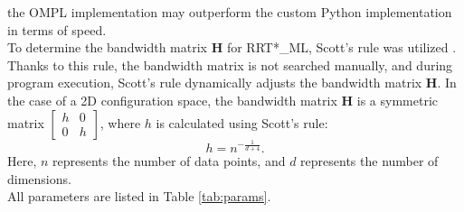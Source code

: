 \documentclass{ctuthesis}
\begin{document}
the OMPL implementation may outperform the custom Python implementation in terms of speed. 
\\[12pt]
To determine the bandwidth matrix $\mathbf{H}$ for RRT*\_ML, 
Scott's rule was utilized \cite{Scott1992MultivariateDE}. 
Thanks to this rule, the bandwidth matrix is not searched manually, 
and during program execution, Scott's rule dynamically adjusts 
the bandwidth matrix $\mathbf{H}$. 
In the case of a 2D configuration space, 
the bandwidth matrix $\mathbf{H}$ is a symmetric 
matrix $\left[ \begin{array}{cc} h & 0 \\ 0 & h \end{array} \right]$, 
where $h$ is calculated using Scott's rule:
\[ h = n^{-\frac{1}{d+4}}. \]
Here, $n$ represents the number of data points, and $d$ represents the number of dimensions.
\\[12pt]
All parameters are listed in Table \ref{tab:params}.
\end{document}
